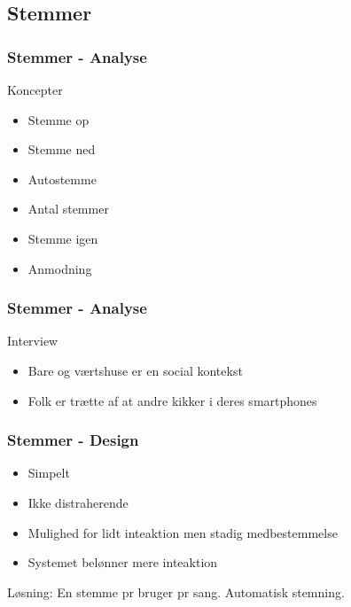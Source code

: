 \subsection{Stemmer}
\begin{frame}
	\frametitle{Stemmer - Analyse}
	Koncepter
	\begin{itemize}
		\item Stemme op
		\item Stemme ned
		\item Autostemme
		\item Antal stemmer
		\item Stemme igen
		\item Anmodning
	\end{itemize}
\end{frame}

\begin{frame}
	\frametitle{Stemmer - Analyse}
	Interview
	\begin{itemize}
		\item Bare og værtshuse er en social kontekst
		\item Folk er trætte af at andre kikker i deres smartphones
	\end{itemize}
\end{frame}

\begin{frame}
	\frametitle{Stemmer - Design}
	\begin{itemize}
		\item Simpelt
		\item Ikke distraherende
		\item Mulighed for lidt inteaktion men stadig medbestemmelse
		\item Systemet belønner mere inteaktion
	\end{itemize}
	Løsning: En stemme pr bruger pr sang. Automatisk stemning.
\end{frame}